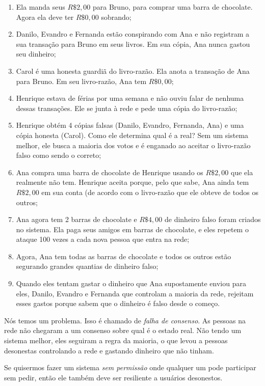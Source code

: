 \begin{enumerate}
\item Ela manda seus $R\$2,00$ para Bruno, para comprar uma barra de chocolate. Agora ela deve ter $R\$0,00$ sobrando;
\item Danilo, Evandro e Fernanda estão conspirando com Ana e não registram a sua transação para Bruno em seus livros. Em sua cópia, Ana nunca gastou seu dinheiro;
\item Carol é uma honesta guardiã do livro-razão. Ela anota a transação de Ana para Bruno. Em seu livro-razão, Ana tem $R\$0,00$;
\item Henrique estava de férias por uma semana e não ouviu falar de nenhuma dessas transações. Ele se junta à rede e pede uma cópia do livro-razão;
\item Henrique obtém 4 cópias falsas (Danilo, Evandro, Fernanda, Ana) e uma cópia honesta (Carol). Como ele determina qual é a real? Sem um sistema melhor, ele busca a maioria dos votos e é enganado ao aceitar o livro-razão falso como sendo o correto;
\item Ana compra uma barra de chocolate de Henrique usando os $R\$2,00$ que ela realmente não tem. Henrique aceita porque, pelo que sabe, Ana ainda tem $R\$2,00$ em sua conta (de acordo com o livro-razão que ele obteve de todos os outros;
\item Ana agora tem 2 barras de chocolate e $R\$4,00$ de dinheiro falso foram criados no sistema. Ela paga seus amigos em barras de chocolate, e eles repetem o ataque 100 vezes a cada nova pessoa que entra na rede;
\item Agora, Ana tem todas as barras de chocolate e todos os outros estão segurando grandes quantias de dinheiro falso;
\item Quando eles tentam gastar o dinheiro que Ana supostamente enviou para eles, Danilo, Evandro e Fernanda que controlam a maioria da rede, rejeitam esses gastos porque sabem que o dinheiro é falso desde o começo.
\end{enumerate}

Nós temos um problema. Isso é chamado de \textit{falha de consenso}. As pessoas na rede não chegaram a um consenso sobre qual é o estado real. Não tendo um sistema melhor, eles seguiram a regra da maioria, o que levou a pessoas desonestas controlando a rede e gastando dinheiro que não tinham.

Se quisermos fazer um sistema \textit{sem permissão} onde qualquer um pode participar sem pedir, então ele também deve ser resiliente a usuários desonestos.

